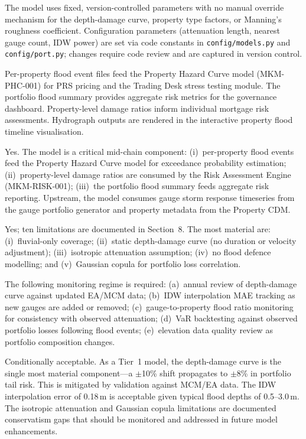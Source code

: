 \documentclass[11pt,a4paper]{article}
\begin{document}
The model uses fixed, version-controlled parameters with no manual override mechanism for the depth-damage curve, property type factors, or Manning's roughness coefficient. Configuration parameters (attenuation length, nearest gauge count, IDW power) are set via code constants in \texttt{config/models.py} and \texttt{config/port.py}; changes require code review and are captured in version control.

Per-property flood event files feed the Property Hazard Curve model (MKM-PHC-001) for PRS pricing and the Trading Desk stress testing module. The portfolio flood summary provides aggregate risk metrics for the governance dashboard. Property-level damage ratios inform individual mortgage risk assessments. Hydrograph outputs are rendered in the interactive property flood timeline visualisation.

Yes. The model is a critical mid-chain component: (i)~per-property flood events feed the Property Hazard Curve model for exceedance probability estimation; (ii)~property-level damage ratios are consumed by the Risk Assessment Engine (MKM-RISK-001); (iii)~the portfolio flood summary feeds aggregate risk reporting. Upstream, the model consumes gauge storm response timeseries from the gauge portfolio generator and property metadata from the Property CDM.

Yes; ten limitations are documented in Section~8. The most material are: (i)~fluvial-only coverage; (ii)~static depth-damage curve (no duration or velocity adjustment); (iii)~isotropic attenuation assumption; (iv)~no flood defence modelling; and (v)~Gaussian copula for portfolio loss correlation.

The following monitoring regime is required: (a)~annual review of depth-damage curve against updated EA/MCM data; (b)~IDW interpolation MAE tracking as new gauges are added or removed; (c)~gauge-to-property flood ratio monitoring for consistency with observed attenuation; (d)~VaR backtesting against observed portfolio losses following flood events; (e)~elevation data quality review as portfolio composition changes.

Conditionally acceptable. As a Tier~1 model, the depth-damage curve is the single most material component---a $\pm$10\% shift propagates to $\pm$8\% in portfolio tail risk. This is mitigated by validation against MCM/EA data. The IDW interpolation error of 0.18\,m is acceptable given typical flood depths of 0.5--3.0\,m. The isotropic attenuation and Gaussian copula limitations are documented conservatism gaps that should be monitored and addressed in future model enhancements.
\end{document}
